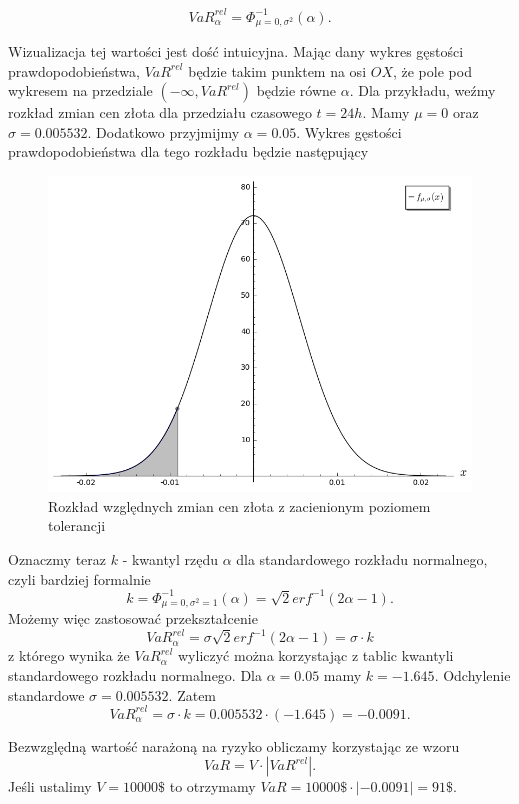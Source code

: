 \documentclass[12pt,titlepage]{article}
\numberwithin{equation}{section}
\begin{document}
$$VaR_{\alpha}^{rel}   =\Phi_{\mu=0,\sigma^{2}}^{-1}(\alpha).$$

Wizualizacja tej wartości jest dość intuicyjna. Mając dany wykres gęstości prawdopodobieństwa, $VaR^{rel}$ będzie takim punktem na osi $OX$, że pole pod wykresem na przedziale $(-\infty,VaR^{rel})$  będzie równe $\alpha$. Dla przykładu, weźmy rozkład zmian cen złota dla przedziału czasowego $t=24h$. Mamy $\mu=0$ oraz $\sigma=0.005532$. Dodatkowo przyjmijmy $\alpha=0.05$. Wykres gęstości prawdopodobieństwa dla tego rozkładu będzie następujący

\begin{figure}[H]
\begin{center}
\includegraphics[scale=0.5]{chart1.png}
\end{center}
\caption{Rozkład względnych zmian cen złota z zacienionym poziomem tolerancji} \label{czynnosci_GD}
\end{figure} 


Oznaczmy teraz $k$ - kwantyl rzędu $\alpha$ dla standardowego rozkładu normalnego, czyli bardziej formalnie 
$$k=\Phi_{\mu=0,\sigma^{2}=1}^{-1}(\alpha)=\sqrt{2} erf^{-1}(2\alpha-1).$$
Możemy więc zastosować przekształcenie
$$VaR_{\alpha}^{rel}   =\sigma \sqrt{2} erf^{-1}(2\alpha-1)=\sigma \cdot k$$
z którego wynika że $VaR_{\alpha}^{rel}$ wyliczyć można korzystając z tablic kwantyli standardowego rozkładu normalnego. Dla $\alpha=0.05$ mamy $k=-1.645$. Odchylenie standardowe $\sigma=0.005532$. Zatem
$$VaR_{\alpha}^{rel}=\sigma \cdot k= 0.005532 \cdot (-1.645)=-0.0091.$$

\noindent Bezwzględną wartość narażoną na ryzyko obliczamy korzystając ze wzoru
$$VaR = V \cdot |VaR^{rel}|.$$
Jeśli ustalimy $V=10000\$$ to otrzymamy $VaR = 10000\$ \cdot |-0.0091| = 91\$ $.
\end{document}
